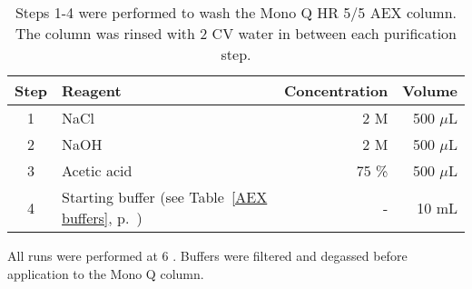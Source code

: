 \bigskip
\begin{table}[H]
\begin{center}
\caption[Cleaning of the Mono Q\textsuperscript{\texttrademark} HR 5/5 AEX Column]{Steps 1-4 were performed to wash the Mono Q\textsuperscript{\texttrademark} HR 5/5 AEX column. The column was rinsed with 2 CV water in between each purification step.}
\vspace{.5cm}
\begin{tabular}{c l r r}
\hline
\label{Washing}
\textbf{Step} & \textbf{Reagent} & \textbf{Concentration} & \textbf{Volume}\Tstrut\Bstrut \\
\hline
1 & NaCl & 2 M & 500 $\mu$L \\ 
2 & NaOH & 2 M & 500 $\mu$L \\
3 & Acetic acid & 75 \% & 500 $\mu$L \\
4 & Starting buffer (see Table~\ref{AEX buffers}, p.~\pageref{AEX buffers}) & - & 10 mL \\[1.1ex]
\hline
\end{tabular}
\end{center}
\end{table}
All runs were performed at 6 \textcelsius. Buffers were filtered and degassed before application to the Mono Q\textsuperscript{\texttrademark} column.



%


